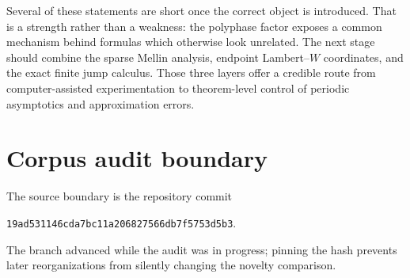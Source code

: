 \documentclass[11pt,oneside]{article}
\numberwithin{equation}{section}
\theoremstyle{definition}
\theoremstyle{remark}
\begin{document}
Several of these statements are short once the correct object is introduced.
That is a strength rather than a weakness: the polyphase factor exposes a
common mechanism behind formulas which otherwise look unrelated.  The next
stage should combine the sparse Mellin analysis, endpoint Lambert--$W$
coordinates, and the exact finite jump calculus.  Those three layers offer a
credible route from computer-assisted experimentation to theorem-level control
of periodic asymptotics and approximation errors.

\appendix

\section{Corpus audit boundary}
\label{app:corpus}

The source boundary is the repository commit
\begin{center}
\nolinkurl{19ad531146cda7bc11a206827566db7f5753d5b3}.
\end{center}
The branch advanced while the audit was in progress; pinning the hash prevents
later reorganizations from silently changing the novelty comparison.
\end{document}
